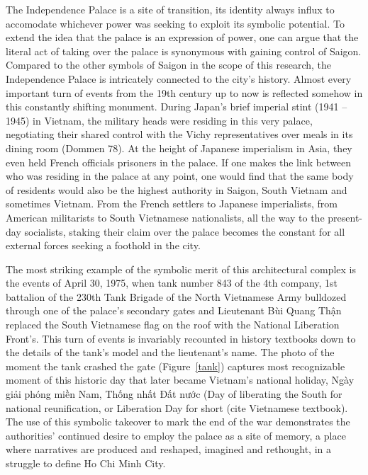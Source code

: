 \vi The Independence Palace is a site of transition, its identity always influx to accomodate whichever power was seeking to exploit its symbolic potential. To extend the idea that the palace is an expression of power, one can argue that the literal act of taking over the palace is synonymous with gaining control of Saigon. Compared to the other symbols of Saigon in the scope of this research, the Independence Palace is intricately connected to the city’s history. Almost every important turn of events from the 19th century up to now is reflected somehow in this constantly shifting monument. During Japan’s brief imperial stint (1941 – 1945) in Vietnam, the military heads were residing in this very palace, negotiating their shared control with the Vichy representatives over meals in its dining room (Dommen 78). At the height of Japanese imperialism in Asia, they even held French officials prisoners in the palace.  If one makes the link between who was residing in the palace at any point, one would find that the same body of residents would also be the highest authority in Saigon, South Vietnam and sometimes Vietnam. From the French settlers to Japanese imperialists, from American militarists to South Vietnamese nationalists, all the way to the present-day socialists, staking their claim over the palace becomes the constant for all external forces seeking a foothold in the city.

The most striking example of the symbolic merit of this architectural complex is the events of April 30, 1975, when tank number 843 of the 4th company, 1st battalion of the 230th Tank Brigade of the North Vietnamese Army bulldozed through one of the palace’s secondary gates and Lieutenant Bùi Quang Thận replaced the South Vietnamese flag on the roof with the National Liberation Front’s. This turn of events is invariably recounted in history textbooks down to the details of the tank’s model and the lieutenant’s name. The photo of the moment the tank crashed the gate (Figure~\ref{tank}) captures most recognizable moment of this historic day that later became Vietnam’s national holiday, Ngày giải phóng miền Nam, Thống nhất Đất nước (Day of liberating the South for national reunification, or Liberation Day for short (cite Vietnamese textbook). The use of this symbolic takeover to mark the end of the war demonstrates the authorities’ continued desire to employ the palace as a site of memory, a place where narratives are produced and reshaped, imagined and rethought, in a struggle to define Ho Chi Minh City. \en

